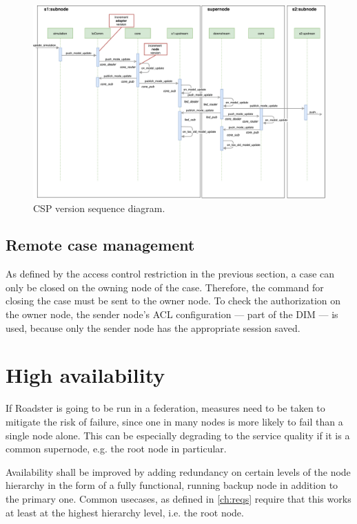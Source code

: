 \begin{figure}[]
	\includegraphics[width=\textwidth]{img/sequence_diagram_model_update_pub.pdf}
	\caption{CSP version sequence diagram.}
	\label{fig:csp:version-sequence}
\end{figure}




\subsection{Remote case management}
As defined by the access control restriction in the previous section, a case
can only be closed on the owning node of the case. Therefore, the command
for closing the case must be sent to the owner node. To check the authorization
on the owner node, the sender node's ACL configuration --- part of the DIM --- is used, because only
the sender node has the appropriate session saved.


\clearpage
\section{High availability}\label{sec:approach:ha}
If Roadster is going to be run in a federation, measures need to be taken to
mitigate the risk of failure, since one in many nodes is more likely to fail than a
single node alone. This can be especially degrading to the service quality if
it is a common supernode, e.g. the root node in particular.

Availability shall be improved by adding redundancy on certain levels of the
node hierarchy in the form of a fully functional, running backup node in
addition to the primary one. Common usecases, as defined in \autoref{ch:reqs}
require that this works at least at the highest hierarchy level, i.e. the root
node.

